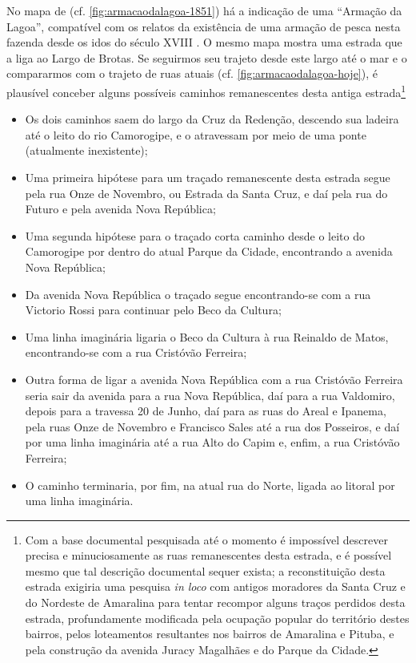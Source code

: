 No mapa de  (cf. \autoref{fig:armacaodalagoa-1851}) há a indicação de uma ``Armação da Lagoa'', compatível com os relatos da existência de uma armação de pesca nesta fazenda desde os idos do século XVIII \cite[p.~120-121]{campos_alagoa_1942}. O mesmo mapa mostra uma estrada que a liga ao Largo de Brotas. Se seguirmos seu trajeto desde este largo até o mar e o compararmos com o trajeto de ruas atuais (cf. \autoref{fig:armacaodalagoa-hoje}), é plausível conceber alguns possíveis caminhos remanescentes desta antiga estrada\footnote{Com a base documental pesquisada até o momento é impossível descrever precisa e minuciosamente as ruas remanescentes desta estrada, e é possível mesmo que tal descrição documental sequer exista; a reconstituição desta estrada exigiria uma pesquisa \textit{in loco} com antigos moradores da Santa Cruz e do Nordeste de Amaralina para tentar recompor alguns traços perdidos desta estrada, profundamente modificada pela ocupação popular do território destes bairros, pelos loteamentos resultantes nos bairros de Amaralina e Pituba, e pela construção da avenida Juracy Magalhães e do Parque da Cidade.}

\begin{itemize}
\item Os dois caminhos saem do largo da Cruz da Redenção, descendo sua ladeira até o leito do rio Camorogipe, e o atravessam por meio de uma ponte (atualmente inexistente);
\item Uma primeira hipótese para um traçado remanescente desta estrada segue pela rua Onze de Novembro, ou Estrada da Santa Cruz, e daí pela rua do Futuro e pela avenida Nova República;
\item Uma segunda hipótese para o traçado corta caminho desde o leito do Camorogipe por dentro do atual Parque da Cidade, encontrando a avenida Nova República;
\item Da avenida Nova República o traçado segue encontrando-se com a rua Victorio Rossi para continuar pelo Beco da Cultura;
\item Uma linha imaginária ligaria o Beco da Cultura à rua Reinaldo de Matos, encontrando-se com a rua Cristóvão Ferreira;
\item Outra forma de ligar a avenida Nova República com a rua Cristóvão Ferreira seria sair da avenida para a rua Nova República, daí para a rua Valdomiro, depois para a travessa 20 de Junho, daí para as ruas do Areal e Ipanema, pela ruas Onze de Novembro e Francisco Sales até a rua dos Posseiros, e daí por uma linha imaginária até a rua Alto do Capim e, enfim, a rua Cristóvão Ferreira;
\item O caminho terminaria, por fim, na atual rua do Norte, ligada ao litoral por uma linha imaginária. 
\end{itemize}


